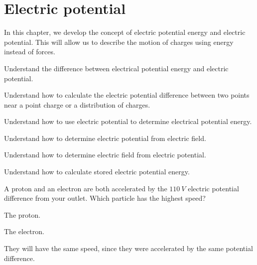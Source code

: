 \chapter{Electric potential}
\label{chapter:potential}
In this chapter, we develop the concept of electric potential energy and electric potential. This will allow us to describe the motion of charges using energy instead of forces. 

\begin{learningObjectives}{
 \item Understand the difference between electrical potential energy and electric potential.
 \item Understand how to calculate the electric potential difference between two points near a point charge or a distribution of charges. 
 \item Understand how to use electric potential to determine electrical potential energy.
 \item Understand how to determine electric potential from electric field.
 \item Understand how to determine electric field from electric potential.
 \item Understand how to calculate stored electric potential energy.
 }
\end{learningObjectives}

\begin{opening}
\begin{MCquestion}{A proton and an electron are both accelerated by the $\SI{110}{V}$ electric potential difference from your outlet. Which particle has the highest speed?}
\item The proton.
\item The electron. \correct
\item They will have the same speed, since they were accelerated by the same potential difference.
\end{MCquestion}
\end{opening}

